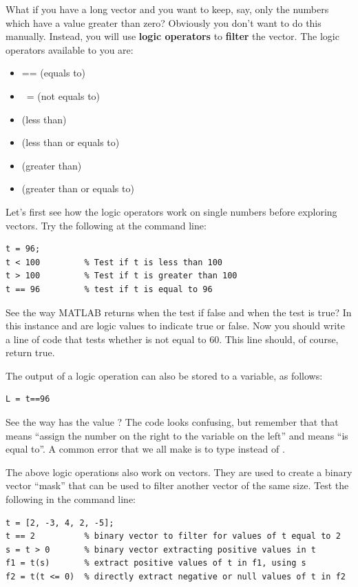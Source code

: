 \documentclass{article}
\begin{document}
What if you have a long vector and you want to keep, say, only the numbers which have a value greater than zero?
Obviously you don't want to do this manually. 
Instead, you will use \textbf{logic operators} to \textbf{filter} the vector. 
The logic operators available to you are:
\begin{itemize}
\item {==} (equals to)
\item {~=} (not equals to)
\item \mcode{<} (less than)
\item \mcode{<=} (less than or equals to)
\item \mcode{>} (greater than)
\item \mcode{>=} (greater than or equals to)
\end{itemize}

Let's first see how the logic operators work on single numbers before exploring vectors. 
Try the following at the command line:
\begin{lstlisting}
t = 96;
t < 100         % Test if t is less than 100
t > 100         % Test if t is greater than 100
t == 96         % test if t is equal to 96
\end{lstlisting}

See the way MATLAB returns  when the test if false and  when the test is true? 
In this instance  and  are logic values to indicate true or false. 
Now you should write a line of code that tests whether  is not equal to 60.
This line should, of course, return true.

The output of a logic operation can also be stored to a variable, as follows:

\begin{lstlisting}
L = t==96
\end{lstlisting}

See the way  has the value ?
The code looks confusing, but remember that that \mcode{=} means ``assign the number on the right to the variable on the left'' and \mcode{==} means ``is equal to''.
A common error that we all make is to type  instead of .

The above logic operations also work on vectors. 
They are used to create a binary vector ``mask'' that can be used to filter another vector of the same size.
Test the following in the command line:
\begin{lstlisting}
t = [2, -3, 4, 2, -5];
t == 2          % binary vector to filter for values of t equal to 2
s = t > 0       % binary vector extracting positive values in t
f1 = t(s)       % extract positive values of t in f1, using s
f2 = t(t <= 0)  % directly extract negative or null values of t in f2
\end{lstlisting}
\end{document}
